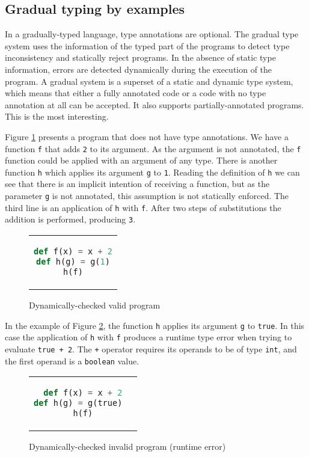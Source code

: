 \documentclass{article}
\newcommand\icode[1]{\texttt{#1}}
\begin{document}
\subsection{Gradual typing by examples}
In a gradually-typed language, type annotations are optional. The gradual type system uses the information of the typed part of the programs to detect type inconsistency and statically reject programs. In the absence of static type information, errors are detected dynamically during the execution of the program. A gradual system is a superset of a static and dynamic type system, which means that either a fully annotated code or a code with no type annotation at all can be accepted. It also supports partially-annotated programs. This is the most interesting. 

Figure \ref{fig:gt-example-1} presents a program that does not have type annotations. We have a function \icode{f} that adds \icode{2} to its argument. As the argument is not annotated, the \icode{f} function could be applied with an argument of any type. There is another function \icode{h} which applies its argument \icode{g} to \icode{1}. Reading the definition of \icode{h} we can see that there is an implicit intention of receiving a function, but as the parameter \icode{g} is not annotated, this assumption is not statically enforced. The third line is an application of \icode{h} with \icode{f}. After two steps of substitutions the addition is performed, producing \icode{3}.
\begin{figure}[!htbp]
\begin{center}
\begin{tabular}{c}
\begin{lstlisting}[language=Python]
def f(x) = x + 2
def h(g) = g(1)
h(f)
\end{lstlisting}
\end{tabular}
\end{center}
\caption{Dynamically-checked valid program}%
\label{fig:gt-example-1}%
\end{figure}
  
In the example of Figure \ref{fig:gt-example-2}, the function \icode{h} applies its argument \icode{g} to \icode{true}. In this case the application of \icode{h} with \icode{f} produces a runtime type error when trying to evaluate \icode{true + 2}. The \icode{+} operator requires its operands to be of type \icode{int}, and the first operand is a \icode{boolean} value.
\begin{figure}[!htbp]
\begin{center}
\begin{tabular}{c}
\begin{lstlisting}[language=Python]
def f(x) = x + 2
def h(g) = g(true)	
h(f)
\end{lstlisting}
\end{tabular}
\end{center}
\caption{Dynamically-checked invalid program (runtime error)}%
\label{fig:gt-example-2}%
\end{figure} 
 
\end{document}
